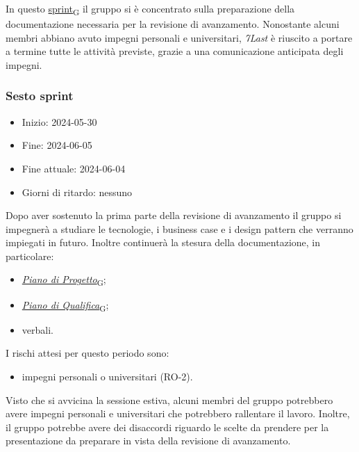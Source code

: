 In questo \href{https://7last.github.io/docs/pb/documentazione-interna/glossario\#sprint}{sprint\textsubscript{G}} il gruppo si è concentrato sulla preparazione della documentazione necessaria per la revisione
di avanzamento.
Nonostante alcuni membri abbiano avuto impegni personali e universitari, \textit{7Last} è riuscito a portare a termine
tutte le attività previste, grazie a una comunicazione anticipata degli impegni.\\



\newpage
\subsubsection{Sesto sprint}
\begin{itemize}
	\item Inizio: 2024-05-30
	\item Fine: 2024-06-05
	\item Fine attuale: 2024-06-04
	\item Giorni di ritardo: nessuno
\end{itemize}

Dopo aver sostenuto la prima parte della revisione di avanzamento il gruppo si impegnerà a studiare le tecnologie, i business case e i design pattern che verranno impiegati in futuro.
Inoltre continuerà la stesura della documentazione, in particolare:
\begin{itemize}
	\item \href{https://7last.github.io/docs/pb/documentazione-interna/glossario\#piano-di-progetto}{\textit{Piano di Progetto}\textsubscript{G}};
	\item \href{https://7last.github.io/docs/pb/documentazione-interna/glossario\#piano-di-qualifica}{\textit{Piano di Qualifica}\textsubscript{G}};
	\item verbali.
\end{itemize}

I rischi attesi per questo periodo sono:
\begin{itemize}
	\item impegni personali o universitari (RO-2).
\end{itemize}
Visto che si avvicina la sessione estiva, alcuni membri del gruppo potrebbero avere impegni personali e universitari che
potrebbero rallentare il lavoro.
Inoltre, il gruppo potrebbe avere dei disaccordi riguardo le scelte da prendere per la  presentazione da preparare in
vista della revisione di avanzamento.

